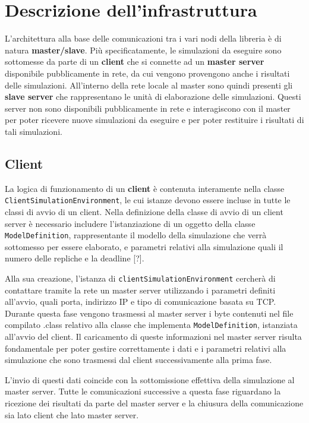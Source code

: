 
\section{Descrizione dell'infrastruttura}
L'architettura alla base delle comunicazioni tra i vari nodi della libreria è di natura \textbf{master/slave}.
Più specificatamente, le simulazioni da eseguire sono sottomesse da parte di un \textbf{client} che si connette ad un \textbf{master server} disponibile pubblicamente in rete, da cui vengono provengono anche i risultati delle simulazioni. 
All'interno della rete locale al master sono quindi presenti gli \textbf{slave server} che rappresentano le unità di elaborazione delle simulazioni. Questi server non sono disponibili pubblicamente in rete e interagiscono con il master per poter ricevere nuove simulazioni da eseguire e per poter restituire i risultati di tali simulazioni.

\subsection{Client}
La logica di funzionamento di un \textbf{client} è contenuta interamente nella classe \texttt{ClientSimulationEnvironment}, le cui istanze devono essere incluse in tutte le classi di avvio di un client.
Nella definizione della classe di avvio di un client server è necessario includere l'istanziazione di un oggetto della classe \texttt{ModelDefinition}, rappresentante il modello della simulazione che verrà sottomesso per essere elaborato, e parametri relativi alla simulazione quali il numero delle repliche e la deadline [?].

Alla sua creazione, l'istanza di \texttt{clientSimulationEnvironment} cercherà di contattare tramite la rete un master server utilizzando i parametri definiti all'avvio, quali porta, indirizzo IP e tipo di comunicazione basata su TCP. 
Durante questa fase vengono trasmessi al master server i byte contenuti nel file compilato .class relativo alla classe che implementa \texttt{ModelDefinition}, istanziata all'avvio del client.
Il caricamento di queste informazioni nel master server risulta fondamentale per poter gestire correttamente i dati e i parametri relativi alla simulazione che sono trasmessi dal client successivamente alla prima fase.

L'invio di questi dati coincide con la sottomissione effettiva della simulazione al master server. 
Tutte le comunicazioni successive a questa fase riguardano la ricezione dei risultati da parte del master server e la chiusura della comunicazione sia lato client che lato master server.

